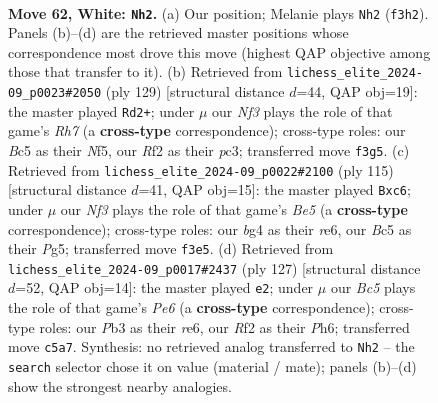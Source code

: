 \documentclass[11pt]{article}
\begin{document}
\clearpage

\begin{figure}[p]\centering
\begin{subfigure}{0.46\textwidth}\centering
\resizebox{\linewidth}{!}{%
\newchessgame
\chessboard[
  setfen={8/1Bk5/8/2B4r/PK4b1/1P3N1p/5R2/8 w - - 2 62},
  showmover=false,
  pgfstyle=straightmove, color=movearrow, markmove={f3-h2}
]}
\caption{}
\end{subfigure}\hfill
\begin{subfigure}{0.46\textwidth}\centering
\resizebox{\linewidth}{!}{%
\newchessgame
\chessboard[
  setfen={8/8/1B1b1kp1/3K1n1p/8/2P5/1P5r/1R6 b - - 15 65},
  showmover=false,
  pgfstyle=straightmove, color=movearrow, markmove={h2-d2}
]}
\caption{}
\end{subfigure}
\\[4pt]
\begin{subfigure}{0.46\textwidth}\centering
\resizebox{\linewidth}{!}{%
\newchessgame
\chessboard[
  setfen={8/8/1pB1R3/p5p1/P2bbk2/8/1r6/3K4 b - - 23 58},
  showmover=false,
  pgfstyle=straightmove, color=movearrow, markmove={e4-c6}
]}
\caption{}
\end{subfigure}\hfill
\begin{subfigure}{0.46\textwidth}\centering
\resizebox{\linewidth}{!}{%
\newchessgame
\chessboard[
  setfen={8/8/4R2p/8/1p2B3/2r1p1b1/1K3kP1/8 b - - 5 64},
  showmover=false,
  pgfstyle=straightmove, color=movearrow, markmove={e3-e2}
]}
\caption{}
\end{subfigure}
\caption{\textbf{Move 62, White: \texttt{Nh2}.} (a) Our position; Melanie plays \texttt{Nh2} (\texttt{f3h2}). Panels (b)--(d) are the retrieved master positions whose correspondence most drove this move (highest QAP objective among those that transfer to it). (b) Retrieved from \texttt{lichess\_elite\_2024-09\_p0023\#2050} (ply 129) [structural distance $d$=44, QAP obj=19]: the master played \texttt{Rd2+}; under $\mu$ our \emph{Nf3} plays the role of that game's \emph{Rh7} (a \textbf{cross-type} correspondence); cross-type roles: our \emph{B}c5 as their \emph{N}f5, our \emph{R}f2 as their \emph{p}c3; transferred move \texttt{f3g5}. (c) Retrieved from \texttt{lichess\_elite\_2024-09\_p0022\#2100} (ply 115) [structural distance $d$=41, QAP obj=15]: the master played \texttt{Bxc6}; under $\mu$ our \emph{Nf3} plays the role of that game's \emph{Be5} (a \textbf{cross-type} correspondence); cross-type roles: our \emph{b}g4 as their \emph{r}e6, our \emph{B}c5 as their \emph{P}g5; transferred move \texttt{f3e5}. (d) Retrieved from \texttt{lichess\_elite\_2024-09\_p0017\#2437} (ply 127) [structural distance $d$=52, QAP obj=14]: the master played \texttt{e2}; under $\mu$ our \emph{Bc5} plays the role of that game's \emph{Pe6} (a \textbf{cross-type} correspondence); cross-type roles: our \emph{P}b3 as their \emph{r}e6, our \emph{R}f2 as their \emph{P}h6; transferred move \texttt{c5a7}. Synthesis: no retrieved analog transferred to \texttt{Nh2} -- the \texttt{search} selector chose it on value (material / mate); panels (b)--(d) show the strongest nearby analogies.}
\label{fig:thought-m122}
\end{figure}
\end{document}
